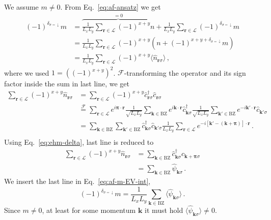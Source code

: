 \begin{tabproof}
	
	We assume $m \neq 0$. From Eq.~\eqref{eq:af-ansatz} we get
	\begin{align}
		(-1)^{\delta_{\sigma=\downarrow}} m &=  \overbrace{\frac{1}{L_x L_y} \sum_{\mathbf{r}\in\mathcal{L}} (-1)^{x+y} n}^{=0} + \frac{1}{L_x L_y} \sum_{\mathbf{r}\in\mathcal{L}} (-1)^{\delta_{\sigma=\downarrow}} m \nonumber \\
		&= \frac{1}{L_x L_y} \sum_{\mathbf{r}\in\mathcal{L}} (-1)^{x+y} \left(
		n + (-1)^{x+y+\delta_{\sigma=\downarrow}} m
		\right) \nonumber \\
		&= \frac{1}{L_x L_y} \sum_{\mathbf{r}\in\mathcal{L}} (-1)^{x+y} \langle \hat n_{\mathbf{r}\sigma} \rangle \, , \label{eq:af-m-EV-int}
	\end{align}
	where we used $1 = \left((-1)^{x+y}\right)^2$. $\mathcal{F}$-transforming the operator and its sign factor inside the sum in last line, we get
	\[
	\begin{aligned}
		\sum_{\mathbf{r}\in\mathcal{L}} (-1)^{x+y} \hat n_{\mathbf{r}\sigma} &= \sum_{\mathbf{r}\in\mathcal{L}} (-1)^{x+y} \hat c_{\mathbf{r}\sigma}^\dagger \hat c_{\mathbf{r}\sigma} \\
		&\stackrel{\mathcal{F}}{=} \sum_{\mathbf{r}\in\mathcal{L}} e^{i \bm{\pi} \cdot \mathbf{r}}
		\frac{1}{\sqrt{L_x L_y}} \sum_{\mathbf{k} \in \mathrm{BZ}} e^{i \mathbf{k} \cdot \mathbf{r}} \hat c_{\mathbf{k}\sigma}^\dagger \frac{1}{\sqrt{L_x L_y}} \sum_{\mathbf{k}' \in \mathrm{BZ}} e^{-i \mathbf{k}' \cdot \mathbf{r}} \hat c_{\mathbf{k}'\sigma} \\
		&=\sum_{\mathbf{k} \in \mathrm{BZ}} \sum_{\mathbf{k}' \in \mathrm{BZ}} \hat c_{\mathbf{k}\sigma}^\dagger \hat c_{\mathbf{k}'\sigma} \frac{1}{L_x L_y} \sum_{\mathbf{r}\in\mathcal{L}} e^{-i [\mathbf{k}' - (\mathbf{k} + \bm{\pi}) ] \cdot \mathbf{r}} \, . \\
	\end{aligned}	
	\]
	Using Eq.~\eqref{eq:ehm-delta}, last line is reduced to
	\begin{align}
		\sum_{\mathbf{r}\in\mathcal{L}} (-1)^{x+y} \hat n_{\mathbf{r}\sigma} &= \sum_{\mathbf{k} \in \mathrm{BZ}} \hat c_{\mathbf{k}\sigma}^\dagger \hat c_{\mathbf{k}+\bm{\pi}\sigma} \label{eq:af-<psi>-not0-int} \\
		&= \sum_{\mathbf{k} \in \mathrm{BZ}} \hat \psi_{\mathbf{k}\sigma} \, . \label{eq:af-<psi>-not0}
	\end{align}
	We insert the last line in Eq.~\eqref{eq:af-m-EV-int},
	\begin{equation}\label{eq:af-m-EV}
		(-1)^{\delta_{\sigma=\downarrow}} m = \frac{1}{L_x L_y} \sum_{\mathbf{k} \in \mathrm{BZ}} \langle \hat \psi_{\mathbf{k}\sigma} \rangle \, .
	\end{equation}
	Since $m \neq 0$, at least for some momentum $\mathbf{k}$ it must hold $\langle \hat \psi_{\mathbf{k}\sigma} \rangle \neq 0$.
\end{tabproof}

